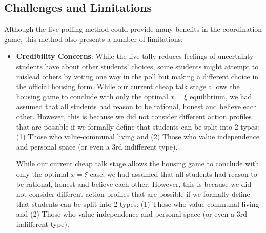 \documentclass[12pt]{article}
\begin{document}
\subsection{Challenges and Limitations}
Although the live polling method could provide many benefits in the coordination game, this method also presents a number of limitations:
\begin{itemize}
    \item \textbf{Credibility Concerns}: While the live tally reduces feelings of uncertainty students have about other students’ choices, some students might attempt to mislead others by voting one way in the poll but making a different choice in the official housing form. 
    While our current cheap talk stage allows the housing game to conclude with only the optimal $x=\xi$ equilibrium, we had assumed that all students had reason to be rational, honest and believe each other. However, this is because we did not consider different action profiles that are possible if we formally define that students can be split into 2 types: (1) Those who value-communal living and (2) Those who value independence and personal space (or even a 3rd indifferent type).

    While our current cheap talk stage allows the housing game to conclude with only the optimal $x = \xi$ case, we had assumed that all students had reason to be rational, honest and believe each other. However, this is because we did not consider different action profiles that are possible if we formally define that students can be split into 2 types: (1) Those who value-communal living and (2) Those who value independence and personal space (or even a 3rd indifferent type).


\end{itemize}
\end{document}
